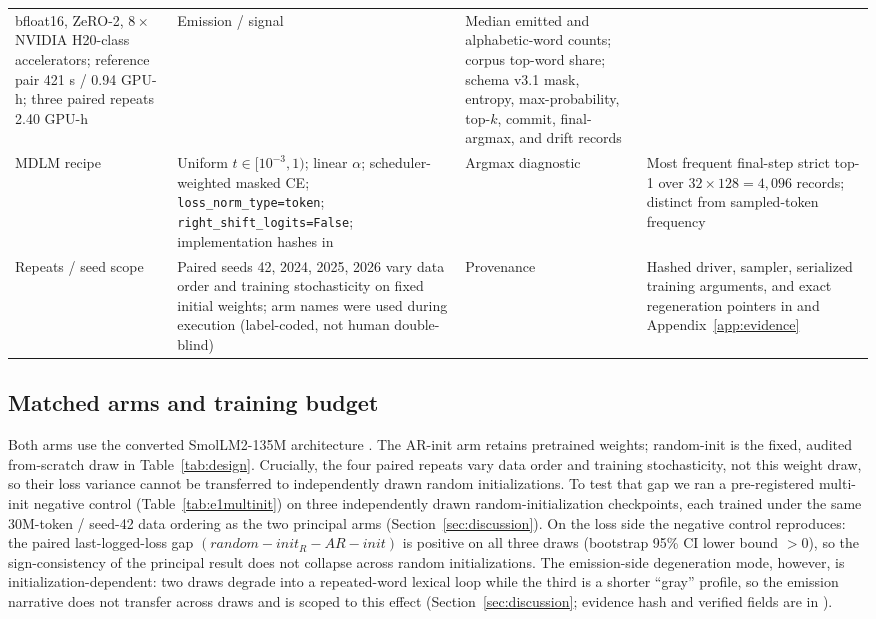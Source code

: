 \documentclass{article}
\newcommand{\armA}{AR-init}
\newcommand{\armB}{random-init}
\begin{document}
\begin{table}[!t]
\begin{tabularx}{\textwidth}{@{}L{0.105\textwidth}Y L{0.105\textwidth}Y@{}}
      bfloat16, ZeRO-2, $8\times$ NVIDIA H20-class accelerators; reference pair 421 s / 0.94 GPU-h;
      three paired repeats 2.40 GPU-h &
    Emission / signal & Median emitted and alphabetic-word counts; corpus
      top-word share; schema v3.1 mask, entropy, max-probability, top-$k$,
      commit, final-argmax, and drift records \\
    MDLM recipe & Uniform $t\in[10^{-3},1)$; linear $\alpha$;
      scheduler-weighted masked CE; \texttt{loss\_norm\_type=token};
      \texttt{right\_shift\_logits=False}; implementation hashes in
       &
    Argmax diagnostic & Most frequent final-step strict top-1 over
      $32\times128=4{,}096$ records; distinct from sampled-token frequency \\
    Repeats / seed scope & Paired seeds 42, 2024, 2025, 2026 vary data order
      and training stochasticity on fixed initial weights; arm names were used
      during execution (label-coded, not human double-blind) &
    Provenance & Hashed driver, sampler, serialized training arguments, and
      exact regeneration pointers in
       and Appendix~\ref{app:evidence} \\
    \bottomrule
  \end{tabularx}
\end{table}

\subsection{Matched arms and training budget}
\label{sec:arms}

Both arms use the converted SmolLM2-135M architecture
\citep{allal2025smollm2,zhou2026dllm}.  The \armA{} arm retains pretrained
weights; \armB{} is the fixed, audited from-scratch draw in
Table~\ref{tab:design}.  Crucially, the four paired repeats vary data order and
training stochasticity, not this weight draw, so their loss variance cannot be
transferred to independently drawn random initializations.  To test that gap
we ran a pre-registered multi-init
negative control (Table~\ref{tab:e1multinit}) on three independently drawn
random-initialization checkpoints, each trained under the same 30M-token /
seed-42 data ordering as the two principal arms
(Section~\ref{sec:discussion}).  On the loss side the negative control
reproduces: the paired last-logged-loss gap $(\armB{}_R-\armA{})$ is positive
on all three draws (bootstrap 95\% CI lower bound $>0$), so the
sign-consistency of the principal result does not collapse across random
initializations.  The emission-side degeneration mode, however, is
initialization-dependent: two draws degrade into a repeated-word lexical loop
while the third is a shorter ``gray'' profile, so the emission narrative does
not transfer across draws and is scoped to this effect
(Section~\ref{sec:discussion}; evidence hash and verified fields are in
).
\end{document}
